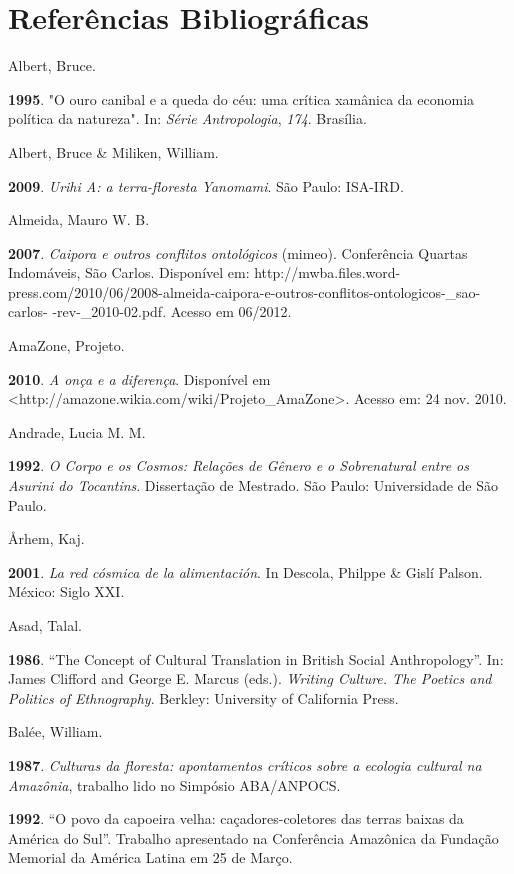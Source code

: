 
\chapter{Referências
Bibliográficas}\label{referuxeancias-bibliogruxe1ficas}

Albert, Bruce.

\textbf{1995}. "O ouro canibal e a queda do céu: uma crítica xamânica da
economia política da natureza". In: \emph{Série Antropologia},
\emph{174}. Brasília.

Albert, Bruce \& Miliken, William.

\textbf{2009}. \emph{Urihi A: a terra-floresta Yanomami}. São Paulo:
ISA-IRD.

Almeida, Mauro W. B.

\textbf{2007}. \emph{Caipora e outros conflitos ontológicos} (mimeo).
Conferência Quartas Indomáveis, São Carlos. Disponível em:
http://mwba.files.word-
press.com/2010/06/2008-almeida-caipora-e-outros-conflitos-ontologicos-\_sao-carlos-
-rev-\_2010-02.pdf. Acesso em 06/2012.

AmaZone, Projeto.

\textbf{2010}. \emph{A onça e a diferença}. Disponível em
\textless{}http://amazone.wikia.com/wiki/Projeto\_AmaZone\textgreater{}.
Acesso em: 24 nov. 2010.

Andrade, Lucia M. M.

\textbf{1992}. \emph{O Corpo e os Cosmos: Relações de Gênero e o
Sobrenatural entre os Asurini do Tocantins}. Dissertação de Mestrado.
São Paulo: Universidade de São Paulo.

Århem, Kaj.

\textbf{2001}. \emph{La red cósmica de la alimentación}. In Descola,
Philppe \& Gislí Palson. México: Siglo XXI.

Asad, Talal.

\textbf{1986}. ``The Concept of Cultural Translation in British Social
Anthropology''. In: James Clifford and George E. Marcus (eds.).
\emph{Writing Culture. The Poetics and Politics of Ethnography}.
Berkley: University of California Press.

Balée, William.

\textbf{1987}. \emph{Culturas da floresta: apontamentos críticos sobre a
ecologia cultural na Amazônia}, trabalho lido no Simpósio ABA/ANPOCS.

\textbf{1992}. ``O povo da capoeira velha: caçadores-coletores das
terras baixas da América do Sul''. Trabalho apresentado na Conferência
Amazônica da Fundação Memorial da América Latina em 25 de Março.

